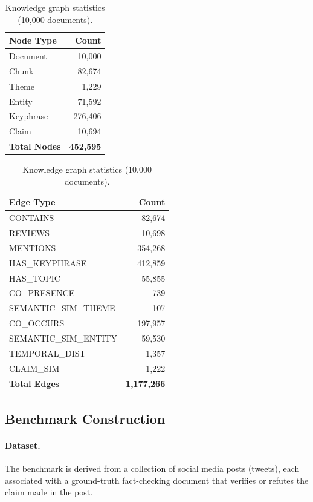 \documentclass[10pt]{article}
\begin{document}
\begin{table}[H]
\centering
\begin{tabular}{lr}
\toprule
\textbf{Node Type} & \textbf{Count} \\
\midrule
Document    & 10,000  \\
Chunk       & 82,674  \\
Theme       & 1,229   \\
Entity      & 71,592  \\
Keyphrase   & 276,406 \\
Claim       & 10,694  \\
\midrule
\textbf{Total Nodes} & \textbf{452,595} \\
\bottomrule
\end{tabular}
\quad
\begin{tabular}{lr}
\toprule
\textbf{Edge Type} & \textbf{Count} \\
\midrule
CONTAINS            & 82,674    \\
REVIEWS             & 10,698    \\
MENTIONS            & 354,268   \\
HAS\_KEYPHRASE      & 412,859   \\
HAS\_TOPIC          & 55,855    \\
CO\_PRESENCE        & 739       \\
SEMANTIC\_SIM\_THEME  & 107     \\
CO\_OCCURS          & 197,957   \\
SEMANTIC\_SIM\_ENTITY & 59,530  \\
TEMPORAL\_DIST      & 1,357     \\
CLAIM\_SIM          & 1,222     \\
\midrule
\textbf{Total Edges} & \textbf{1,177,266} \\
\bottomrule
\end{tabular}
\caption{Knowledge graph statistics (10,000 documents).}
\label{tab:kg_stats}
\end{table}


\subsection{Benchmark Construction}

\paragraph{Dataset.} The benchmark is derived from a collection of social media posts (tweets), each associated with a ground-truth fact-checking document that verifies or refutes the claim made in the post.
\end{document}
